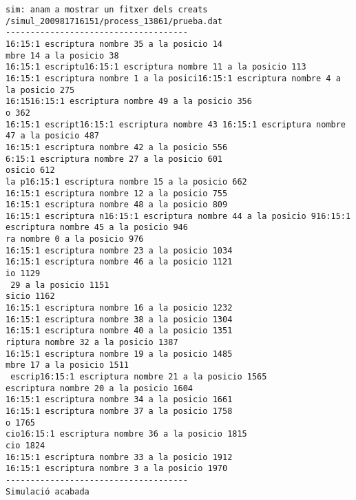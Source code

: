 \begin{footnotesize}
\begin{verbatim}
sim: anam a mostrar un fitxer dels creats
/simul_200981716151/process_13861/prueba.dat
-------------------------------------
16:15:1 escriptura nombre 35 a la posicio 14
mbre 14 a la posicio 38
16:15:1 escriptu16:15:1 escriptura nombre 11 a la posicio 113
16:15:1 escriptura nombre 1 a la posici16:15:1 escriptura nombre 4 a la posicio 275
16:1516:15:1 escriptura nombre 49 a la posicio 356
o 362
16:15:1 escript16:15:1 escriptura nombre 43 16:15:1 escriptura nombre 47 a la posicio 487
16:15:1 escriptura nombre 42 a la posicio 556
6:15:1 escriptura nombre 27 a la posicio 601
osicio 612
la p16:15:1 escriptura nombre 15 a la posicio 662
16:15:1 escriptura nombre 12 a la posicio 755
16:15:1 escriptura nombre 48 a la posicio 809
16:15:1 escriptura n16:15:1 escriptura nombre 44 a la posicio 916:15:1 escriptura nombre 45 a la posicio 946
ra nombre 0 a la posicio 976
16:15:1 escriptura nombre 23 a la posicio 1034
16:15:1 escriptura nombre 46 a la posicio 1121
io 1129
 29 a la posicio 1151
sicio 1162
16:15:1 escriptura nombre 16 a la posicio 1232
16:15:1 escriptura nombre 38 a la posicio 1304
16:15:1 escriptura nombre 40 a la posicio 1351
riptura nombre 32 a la posicio 1387
16:15:1 escriptura nombre 19 a la posicio 1485
mbre 17 a la posicio 1511
 escrip16:15:1 escriptura nombre 21 a la posicio 1565
escriptura nombre 20 a la posicio 1604
16:15:1 escriptura nombre 34 a la posicio 1661
16:15:1 escriptura nombre 37 a la posicio 1758
o 1765
cio16:15:1 escriptura nombre 36 a la posicio 1815
cio 1824
16:15:1 escriptura nombre 33 a la posicio 1912
16:15:1 escriptura nombre 3 a la posicio 1970
-------------------------------------
Simulació acabada
\end{verbatim}
\end{footnotesize}
